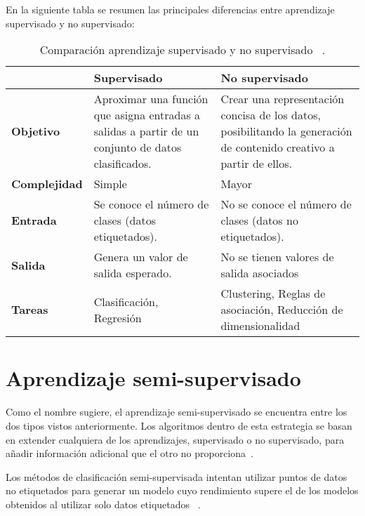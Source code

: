 
En la siguiente tabla se resumen las principales diferencias entre aprendizaje supervisado y no supervisado:
\begin{table}[ht]
	\centering
	\begin{tabular}{@{}p{2.5cm} p{5cm} p{5cm}@{}}
		\toprule
			 & \textbf{Supervisado} & \textbf{No supervisado} \\
		\midrule
		\textbf{Objetivo} & Aproximar una función que asigna entradas a salidas a partir de un conjunto de datos clasificados. & Crear una representación concisa de los datos, posibilitando la generación de contenido creativo a partir de ellos. \\
		\addlinespace[0.5em]
		\textbf{Complejidad} & Simple & Mayor\\
		\addlinespace[0.5em]
		\textbf{Entrada} & Se conoce el número de clases (datos etiquetados). & No se conoce el número de clases (datos no etiquetados). \\
		\addlinespace[0.5em]
		\textbf{Salida} & Genera un valor de salida esperado. & No se tienen valores de salida asociados \\
		\addlinespace[0.5em]
		\textbf{Tareas} & Clasificación, Regresión & Clustering, Reglas de asociación, Reducción de dimensionalidad \\
		\bottomrule
	\end{tabular}
	\caption{Comparación aprendizaje supervisado y no supervisado ~\cite{USL:guide}.}
	\label{supervisado_VS_noSupervisado}
\end{table}
\newpage


\section{Aprendizaje semi-supervisado}
Como el nombre sugiere, el aprendizaje semi-supervisado se encuentra entre los dos tipos vistos anteriormente. Los algoritmos dentro de esta estrategia se basan en extender cualquiera de los aprendizajes, supervisado o no supervisado, para añadir información adicional que el otro no proporciona~\cite{Intro:SemiSupervised}.

Los métodos de clasificación semi-supervisada intentan utilizar puntos de datos no etiquetados para generar un modelo cuyo rendimiento supere el de los modelos obtenidos al utilizar solo datos etiquetados ~\cite{Engelen:semi-supervised}. 

